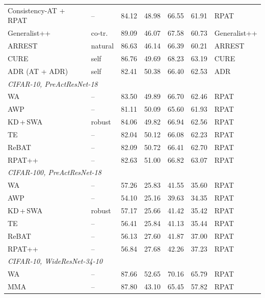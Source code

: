\documentclass{article} %
\theoremstyle{plain}
\begin{document}
\begin{table}[!htbp]
\begin{tabular}{llrrrrl}
    Consistency-AT + RPAT     & --      & 84.12 & 48.98 & 66.55 & 61.91 & RPAT \\
    Generalist++              & co-tr.  & 89.09 & 46.07 & 67.58 & 60.73 & Generalist++ \\
    ARREST                    & natural & 86.63 & 46.14 & 66.39 & 60.21 & ARREST \\
    CURE                      & self    & 86.76 & 49.69 & 68.23 & 63.19 & CURE \\
    ADR (AT + ADR)            & self    & 82.41 & 50.38 & 66.40 & 62.53 & ADR \\
    \midrule
    \multicolumn{7}{l}{\emph{CIFAR-10, PreActResNet-18}} \\
    WA \citep{swa}            & --      & 83.50 & 49.89 & 66.70 & 62.46 & RPAT \\
    AWP \citep{2020_awp}      & --      & 81.11 & 50.09 & 65.60 & 61.93 & RPAT \\
    KD\,+\,SWA \citep{kdswa}   & robust  & 84.06 & 49.82 & 66.94 & 62.56 & RPAT \\
    TE \citep{te}             & --      & 82.04 & 50.12 & 66.08 & 62.23 & RPAT \\
    ReBAT \citep{rebat}       & --      & 82.09 & 50.72 & 66.41 & 62.70 & RPAT \\
    RPAT++ \citep{rpat}       & --      & 82.63 & 51.00 & 66.82 & 63.07 & RPAT \\
    \midrule
    \multicolumn{7}{l}{\emph{CIFAR-100, PreActResNet-18}} \\
    WA \citep{swa}            & --      & 57.26 & 25.83 & 41.55 & 35.60 & RPAT \\
    AWP \citep{2020_awp}      & --      & 54.10 & 25.16 & 39.63 & 34.35 & RPAT \\
    KD\,+\,SWA \citep{kdswa}   & robust  & 57.17 & 25.66 & 41.42 & 35.42 & RPAT \\
    TE \citep{te}             & --      & 56.41 & 25.84 & 41.13 & 35.44 & RPAT \\
    ReBAT \citep{rebat}       & --      & 56.13 & 27.60 & 41.87 & 37.00 & RPAT \\
    RPAT++ \citep{rpat}       & --      & 56.84 & 27.68 & 42.26 & 37.23 & RPAT \\
    \midrule
    \multicolumn{7}{l}{\emph{CIFAR-10, WideResNet-34-10}} \\
    WA \citep{swa}            & --      & 87.66 & 52.65 & 70.16 & 65.79 & RPAT \\
    MMA \citep{mma}           & --      & 87.80 & 43.10 & 65.45 & 57.82 & RPAT \\

\end{tabular}
\end{table}
\end{document}
